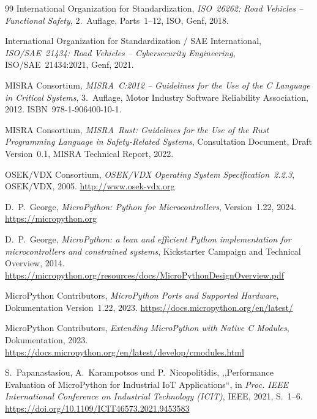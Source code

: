 ﻿\documentclass[12pt,a4paper,twoside]{article}
\newcommand{\doi}[1]{\url{https://doi.org/#1}}
\begin{document}
\begin{thebibliography}{99}
  {International Organization for Standardization},
  \textit{ISO~26262: Road Vehicles -- Functional Safety},
  2.~Auflage, Parts~1--12, ISO, Genf, 2018.

  {International Organization for Standardization / SAE International},
  \textit{ISO/SAE~21434: Road Vehicles -- Cybersecurity Engineering},
  ISO/SAE~21434:2021, Genf, 2021.

  {MISRA Consortium},
  \textit{MISRA~C:2012 -- Guidelines for the Use of the C Language in Critical Systems},
  3.~Auflage, Motor Industry Software Reliability Association, 2012.
  ISBN~978-1-906400-10-1.

  {MISRA Consortium},
  \textit{MISRA~Rust: Guidelines for the Use of the Rust Programming Language
  in Safety-Related Systems},
  Consultation Document, Draft Version~0.1, MISRA Technical Report, 2022.

  {OSEK/VDX Consortium},
  \textit{OSEK/VDX Operating System Specification~2.2.3},
  OSEK/VDX, 2005.
  \url{http://www.osek-vdx.org}


  D.~P.~George,
  \textit{MicroPython: Python for Microcontrollers},
  Version~1.22, 2024.
  \url{https://micropython.org}

  D.~P.~George,
  \textit{MicroPython: a lean and efficient Python implementation
  for microcontrollers and constrained systems},
  Kickstarter Campaign and Technical Overview, 2014.
  \url{https://micropython.org/resources/docs/MicroPythonDesignOverview.pdf}

  {MicroPython Contributors},
  \textit{MicroPython Ports and Supported Hardware},
  Dokumentation Version~1.22, 2023.
  \url{https://docs.micropython.org/en/latest/}

  {MicroPython Contributors},
  \textit{Extending MicroPython with Native C Modules},
  Dokumentation, 2023.
  \url{https://docs.micropython.org/en/latest/develop/cmodules.html}

  S.~Papanastasiou, A.~Karampotsos und P.~Nicopolitidis,
  ,,Performance Evaluation of MicroPython for Industrial IoT Applications``,
  in \textit{Proc. IEEE International Conference on Industrial Technology (ICIT)},
  IEEE, 2021, S.~1--6.
  \doi{10.1109/ICIT46573.2021.9453583}


\end{thebibliography}
\end{document}
